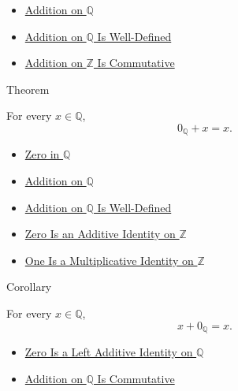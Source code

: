 \begin{dependencies}
\begin{itemize}
  \item \hyperref[def:addition-on-q-classes]{Addition on $\mathbb{Q}$}
  \item \hyperref[thm:addition-on-q-well-defined]{Addition on $\mathbb{Q}$ Is Well-Defined}
  \item \hyperref[thm:addition-on-z-commutative]{Addition on $\mathbb{Z}$ Is Commutative}
\end{itemize}
\end{dependencies}

\begin{theorembox}{Theorem}
\begin{theorem}
\label{thm:zero-left-additive-identity-on-q}
For every $x\in\mathbb{Q}$,
\[
0_{\mathbb{Q}}+x=x.
\]
\end{theorem}
\end{theorembox}

\begin{dependencies}
\begin{itemize}
  \item \hyperref[def:zero-in-q]{Zero in $\mathbb{Q}$}
  \item \hyperref[def:addition-on-q-classes]{Addition on $\mathbb{Q}$}
  \item \hyperref[thm:addition-on-q-well-defined]{Addition on $\mathbb{Q}$ Is Well-Defined}
  \item \hyperref[thm:zero-additive-identity-on-z]{Zero Is an Additive Identity on $\mathbb{Z}$}
  \item \hyperref[thm:one-multiplicative-identity-on-z]{One Is a Multiplicative Identity on $\mathbb{Z}$}
\end{itemize}
\end{dependencies}

\begin{corollarybox}{Corollary}
\begin{corollary}
\label{cor:zero-right-additive-identity-on-q}
For every $x\in\mathbb{Q}$,
\[
x+0_{\mathbb{Q}}=x.
\]
\end{corollary}
\end{corollarybox}

\begin{dependencies}
\begin{itemize}
  \item \hyperref[thm:zero-left-additive-identity-on-q]{Zero Is a Left Additive Identity on $\mathbb{Q}$}
  \item \hyperref[thm:addition-on-q-commutative]{Addition on $\mathbb{Q}$ Is Commutative}
\end{itemize}
\end{dependencies}

